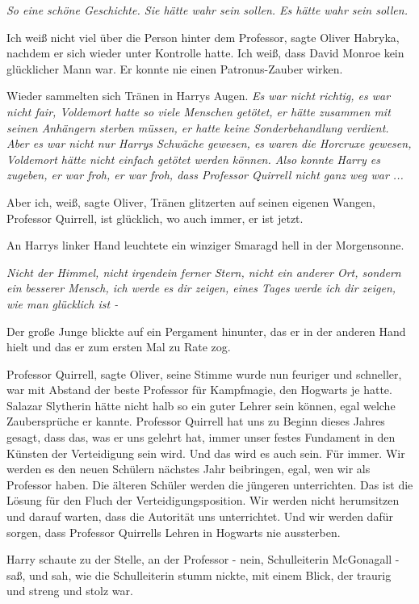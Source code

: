 \emph{So eine schöne Geschichte. Sie hätte wahr sein sollen. Es hätte wahr sein
sollen.}

\glqq{}Ich weiß nicht viel über die Person hinter dem Professor\grqq{}, sagte
Oliver Habryka, nachdem er sich wieder unter Kontrolle hatte. \glqq{}Ich weiß,
dass David Monroe kein glücklicher Mann war. Er konnte nie einen Patronus-Zauber
wirken.\grqq{}

Wieder sammelten sich Tränen in Harrys Augen. \emph{Es war nicht richtig, es war
nicht fair, Voldemort hatte so viele Menschen getötet, er hätte zusammen mit
seinen Anhängern sterben müssen, er hatte keine Sonderbehandlung verdient.}
\emph{Aber es war nicht nur Harrys Schwäche gewesen, es waren die Horcruxe
gewesen, Voldemort hätte nicht einfach getötet werden können. Also konnte Harry
es zugeben, er war froh, er war froh, dass Professor Quirrell nicht ganz weg
war ...}

\glqq{}Aber ich, weiß\grqq{}, sagte Oliver, Tränen glitzerten auf seinen eigenen
Wangen, \glqq{}Professor Quirrell, ist glücklich, wo auch immer, er ist
jetzt.\grqq{}

An Harrys linker Hand leuchtete ein winziger Smaragd hell in der Morgensonne.

\emph{Nicht der Himmel, nicht irgendein ferner Stern, nicht ein anderer Ort,
sondern ein besserer Mensch, ich werde es dir zeigen, eines Tages werde ich dir
zeigen, wie man glücklich ist -}

Der große Junge blickte auf ein Pergament hinunter, das er in der anderen Hand
hielt und das er zum ersten Mal zu Rate zog.

\glqq{}Professor Quirrell\grqq{}, sagte Oliver, seine Stimme wurde nun feuriger
und schneller, \glqq{}war mit Abstand der beste Professor für Kampfmagie, den
Hogwarts je hatte. Salazar Slytherin hätte nicht halb so ein guter Lehrer sein
können, egal welche Zaubersprüche er kannte. Professor Quirrell hat uns zu
Beginn dieses Jahres gesagt, dass das, was er uns gelehrt hat, immer unser
festes Fundament in den Künsten der Verteidigung sein wird. Und das wird es auch
sein. Für immer. Wir werden es den neuen Schülern nächstes Jahr beibringen,
egal, wen wir als Professor haben. Die älteren Schüler werden die jüngeren
unterrichten. Das ist die Lösung für den Fluch der Verteidigungsposition. Wir
werden nicht herumsitzen und darauf warten, dass die Autorität uns unterrichtet.
Und wir werden dafür sorgen, dass Professor Quirrells Lehren in Hogwarts nie
aussterben.\grqq{}

Harry schaute zu der Stelle, an der Professor - nein, Schulleiterin McGonagall -
saß, und sah, wie die Schulleiterin stumm nickte, mit einem Blick, der traurig
und streng und stolz war.

